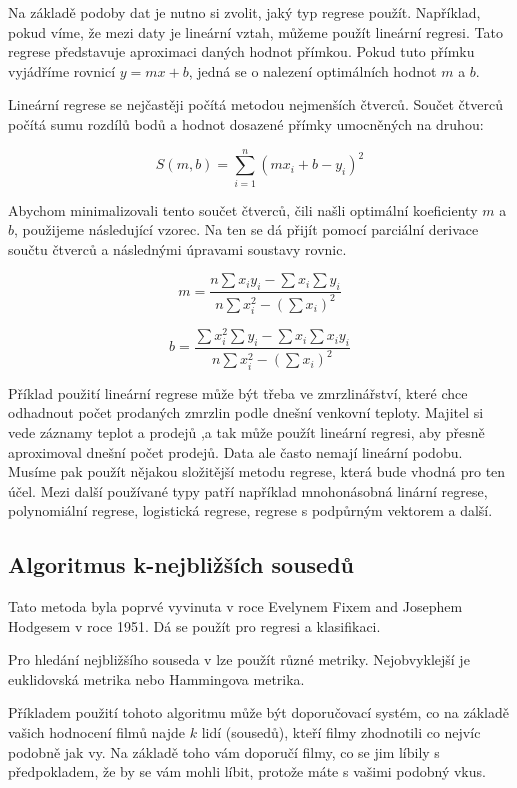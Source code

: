 \documentclass[a4paper,11pt, oneside]{book} \usepackage[czech]{babel}
\begin{document}
	Na základě podoby dat je nutno si zvolit, jaký typ regrese použít. Například,
	pokud víme, že mezi daty je lineární vztah, můžeme použít lineární regresi.
	Tato regrese představuje aproximaci daných hodnot přímkou.
	Pokud tuto přímku vyjádříme rovnicí \(y = mx + b\), jedná se o nalezení
	optimálních hodnot \(m\) a \(b\).

	Lineární regrese se nejčastěji počítá metodou nejmenších čtverců.
	Součet čtverců počítá sumu rozdílů bodů a hodnot dosazené přímky umocněných
	na druhou:

	\[ S(m,b) = \sum_{i=1}^n (mx_i + b - y_i )^2 \]

	Abychom minimalizovali tento součet čtverců, čili našli optimální koeficienty \(m\) a \(b\),
	použijeme následující vzorec. Na ten se dá přijít pomocí parciální derivace součtu čtverců a
	následnými úpravami soustavy rovnic.

	\[ m = \frac{n \sum x_i y_i - \sum x_i \sum y_i}{n \sum x_i^2 - (\sum x_i)^2 }\]

	\[ b = \frac{\sum x_i^2 \sum y_i - \sum x_i \sum x_i y_i }{n \sum x_i^2 - (\sum x_i)^2}\]

	Příklad použití lineární regrese může být třeba ve zmrzlinářství, které
	chce odhadnout počet prodaných zmrzlin podle dnešní venkovní teploty.
	Majitel si vede záznamy teplot a prodejů ,a tak může použít lineární regresi, aby
	přesně aproximoval dnešní počet prodejů.
	Data ale často nemají lineární podobu. Musíme pak použít nějakou složitější metodu regrese,
	která bude vhodná pro ten účel. Mezi další používané typy patří například mnohonásobná
	linární regrese, polynomiální regrese, logistická regrese, regrese s podpůrným vektorem
	a další.


	\subsection{Algoritmus k-nejbližších sousedů}

	Tato metoda byla poprvé vyvinuta v roce Evelynem Fixem and Josephem Hodgesem v roce 1951.
	Dá se použít pro regresi a klasifikaci.

	Pro hledání nejbližšího souseda v lze použít různé metriky.
	Nejobvyklejší je euklidovská metrika nebo Hammingova metrika.

	Příkladem použití tohoto algoritmu může být doporučovací systém, co na základě vašich
	hodnocení filmů najde \(k\) lidí (sousedů), kteří filmy zhodnotili co nejvíc podobně
	jak vy. Na základě toho vám doporučí filmy, co se jim líbily s předpokladem, že by se vám
	mohli líbit, protože máte s vašimi  podobný vkus.
\end{document}
